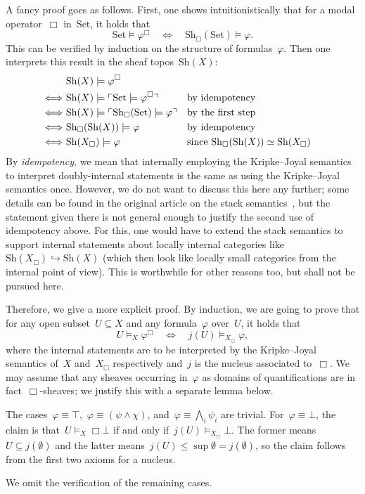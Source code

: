 \documentclass[10pt,reqno,a4paper]{amsbook}
\makeatletter
\theoremstyle{definition}
\theoremstyle{plain}
\theoremstyle{remark}
\newcommand{\Set}{\mathrm{Set}}
\newcommand{\Sh}{\mathrm{Sh}}
\newcommand{\?}{\,{:}\,}
\renewcommand{\_}{\mathpunct{.}\,}
\newcommand{\speak}[1]{\ulcorner\text{\textnormal{#1}}\urcorner}
\renewenvironment{proof}[1][\proofname]{\par
  \pushQED{\qed}%
  \normalfont \topsep6\p@\@plus6\p@\relax
  \trivlist
  \item[\hskip\labelsep
        \itshape
    #1\@addpunct{.}]\ignorespaces
}{%
  \popQED\endtrivlist\@endpefalse
}
\makeatother
\begin{document}
\begin{proof}[Proof of Theorem~\ref{thm:box-translation-semantically}]
A fancy proof goes as follows. First, one shows intuitionistically that for a
modal operator~$\Box$ in~$\Set$, it holds that
\[ \Set \models \varphi^\Box \quad\Longleftrightarrow\quad
  \Sh_\Box(\Set) \models \varphi. \]
This can be verified by induction on the structure of
formulas~$\varphi$. Then one interprets this result in the sheaf topos~$\Sh(X)$:
\begin{align*}
  &\ \Sh(X) \models \varphi^\Box \\
  \Longleftrightarrow&\
  \Sh(X) \models \speak{$\Set \models \varphi^\Box$} &&\text{by idempotency}\\
  \Longleftrightarrow&\
  \Sh(X) \models \speak{$\Sh_\Box(\Set) \models \varphi$} &&\text{by the first step} \\
  \Longleftrightarrow&\
  \Sh_\Box(\Sh(X)) \models \varphi &&\text{by idempotency} \\
  \Longleftrightarrow&\
  \Sh(X_\Box) \models \varphi &&\text{since~$\Sh_\Box(\Sh(X)) \simeq
  \Sh(X_\Box)$}
\end{align*}
By \emph{idempotency}, we mean that internally employing the Kripke--Joyal
semantics to interpret doubly-internal statements is the same as using the
Kripke--Joyal semantics once. However, we do not want to discuss this here any further;
some details can be found in the original article on the stack
semantics~\cite[Lemma~7.20]{shulman:stack}, but the statement given there is not
general enough to justify the second use of idempotency above. For this, one
would have to extend the stack semantics to support internal statements about
locally internal categories like~$\Sh(X_\Box) \hookrightarrow \Sh(X)$ (which
then look like locally small categories from the internal point of view). This
is worthwhile for other reasons too, but shall not be pursued here.

Therefore, we give a more explicit proof. By induction, we are going to prove
that for any open subset~$U \subseteq X$ and any formula~$\varphi$ over~$U$, it
holds that
\[ U \models_X \varphi^\Box \quad\Longleftrightarrow\quad j(U) \models_{X_\Box}
\varphi, \]
where the internal statements are to be interpreted by the Kripke--Joyal
semantics of~$X$ and~$X_\Box$ respectively and~$j$ is the nucleus associated
to~$\Box$. We may assume that any sheaves occurring in~$\varphi$ as domains of
quantifications are in fact~$\Box$-sheaves; we justify this with a separate lemma
below.

The cases~$\varphi \equiv \top$,~$\varphi \equiv (\psi \wedge \chi)$,
and~$\varphi \equiv \bigwedge_i \psi_i$ are trivial. For~$\varphi \equiv \bot$,
the claim is that~$U \models_X \Box\bot$ if and only if~$j(U)
\models_{X_\Box} \bot$. The former means~$U \subseteq j(\emptyset)$ and the
latter means~$j(U) \leq \sup \emptyset = j(\emptyset)$, so the claim follows from
the first two axioms for a nucleus.

We omit the verification of the remaining cases.
\end{proof}
\end{document}
